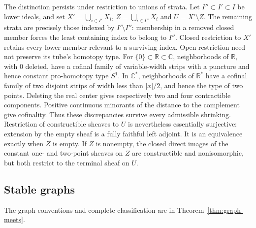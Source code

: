 \documentclass[11pt,a4paper]{article}
\theoremstyle{definition}
\newcommand{\R}{\mathbb R}
\newcommand{\C}{\mathbb C}
\begin{document}
The distinction persists under restriction to unions of strata.
Let $I''\subset I'\subset I$ be lower ideals, and set
$X'=\bigcup_{i\in I'}X_i$, $Z=\bigcup_{i\in I''}X_i$ and
$U=X'\setminus Z$. The remaining strata are precisely those indexed
by $I'\setminus I''$: membership in a removed closed member forces
the least containing index to belong to $I''$. Closed restriction to
$X'$ retains every lower member relevant to a surviving index.
Open restriction need not preserve its tube's homotopy type. For
$\{0\}\subset\R\subset\C$, neighborhoods of $\R$, with $0$
deleted, have a cofinal family of variable-width strips with a puncture
and hence constant pro-homotopy type $S^1$. In $\C^*$, neighborhoods
of $\R^*$ have a cofinal family of two disjoint strips of width less
than $|x|/2$, and hence the type of two points. Deleting the real center
gives respectively two and four contractible components. Positive
continuous minorants of the distance to the complement give cofinality.
Thus these discrepancies survive every admissible shrinking.
Restriction of constructible sheaves to $U$ is nevertheless essentially
surjective: extension by the empty sheaf is a fully faithful left
adjoint. It is an equivalence exactly when $Z$ is empty. If $Z$ is
nonempty, the closed direct images of the constant one- and two-point
sheaves on $Z$ are constructible and nonisomorphic, but both restrict
to the terminal sheaf on $U$.

\subsection{Stable graphs}
The graph conventions and complete classification are in Theorem~\ref{thm:graph-meets}.
\end{document}
